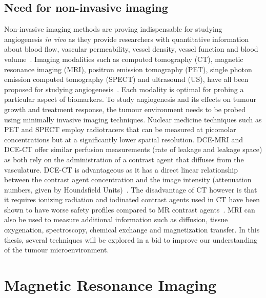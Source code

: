 \subsection{Need for non-invasive imaging}
Non-invasive imaging methods are proving indispensable for studying angiogenesis \emph{in vivo} as they provide researchers with quantitative information about blood flow, vascular permeability, vessel density, vessel function and blood volume~\cite{McDonald:2003cm}.
Imaging modalities such as computed tomography (CT), magnetic resonance imaging (MRI), positron emission tomography (PET), single photon emission computed tomography (SPECT) and ultrasound (US), have all been proposed for studying angiogenesis~\cite{Laking:2006ij}.
Each modality is optimal for probing a particular aspect of biomarkers. 
To study angiogenesis and its effects on tumour growth and treatment response, the tumour environment needs to be probed using minimally invasive imaging techniques. 
Nuclear medicine techniques such as PET and SPECT employ radiotracers that can be measured at picomolar concentrations but at a significantly lower spatial resolution.
DCE-MRI and DCE-CT offer similar perfusion measurements (rate of leakage and leakage space) as both rely on the administration of a contrast agent that diffuses from the vasculature.
DCE-CT is advantageous as it has a direct linear relationship between the contrast agent concentration and the image intensity (attenuation numbers, given by Houndsfield Units)~\cite{Cuenod:2006jy}.
The disadvantage of CT however is that it requires ionizing radiation and iodinated contrast agents used in CT have been shown to have worse safety profiles compared to MR contrast agents~\cite{Hasebroock:2009hw}.
MRI can also be used to measure additional information such as diffusion, tissue oxygenation, spectroscopy, chemical exchange and magnetization transfer. 
In this thesis, several techniques will be explored in a bid to improve our understanding of the tumour microenvironment.

\section{Magnetic Resonance Imaging}

